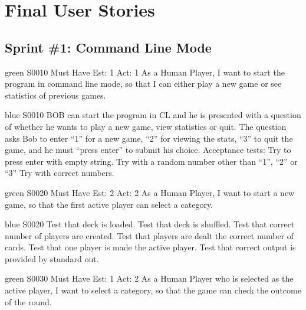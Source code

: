 \newpage
\section{Final User Stories}
\label{appendix:user_stories}

\subsection{Sprint \#1: Command Line Mode} 
\label{appendix:user_stories_command_line}
\bigskip


\begin{card}{green}
{S0010}
{Must Have}
{Est: 1}
{Act: 1}
As a Human Player, I want to start the program in command line mode, so that I can either play a new game or see statistics of previous games.
\end{card}

\begin{card}{blue}
{S0010}{}{}{}
BOB can start the program in CL and he is presented with a question of whether he wants to play a new game, view statistics or quit. 
The question asks Bob to enter ``1'' for a new game, ``2'' for viewing the stats, ``3'' to quit the game, and he must ``press enter'' to submit his choice. Acceptance tests: Try to press enter with empty string. 
Try with a random number other than ``1'', ``2'' or ``3'' Try with correct numbers.
\end{card}


\newpage

\begin{card}{green}
{S0020}
{Must Have}
{Est: 2}
{Act: 2}
As a Human Player, I want to start a new game, so that the first active player can select a category.
\end{card}

\begin{card}{blue}
{S0020}{}{}{}
Test that deck is loaded. 
Test that deck is shuffled. 
Test that correct number of players are created. 
Test that players are dealt the correct number of cards. 
Test that one player is made the active player. 
Test that correct output is provided by standard out.
\end{card}


\newpage

\begin{card}{green}
{S0030}
{Must Have}
{Est: 1}
{Act: 2}
As a Human Player who is selected as the active player, I want to select a category, so that the game can check the outcome of the round.
\end{card}


